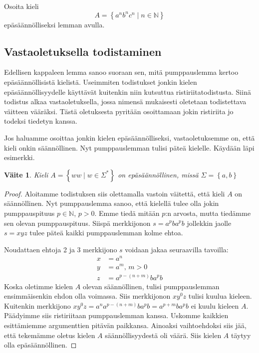\documentclass[a4paper,11pt]{article}
\newtheorem*{claim}{Väite}
\theoremstyle{definition}
\newcommand{\set}[1]{{\left\{ #1 \right\}}}
\newcommand{\Nat}{\mathbb{N}}
\begin{document}
\begin{exercise}
  Osoita kieli
  \begin{equation*}
      A = \set{a^nb^nc^n \mid n \in \Nat}
  \end{equation*}
  epäsäännölliseksi lemman avulla.
\end{exercise}

\subsection*{Vastaoletuksella todistaminen}

Edellisen kappaleen lemma sanoo suoraan sen, mitä pumppauslemma kertoo
e\-pä\-sään\-nöl\-li\-sis\-tä kielistä. Useimmiten todistukset jonkin
kielen e\-pä\-sään\-nöl\-li\-syy\-del\-le käyttävät kuitenkin niin
kutsuttua ristiriitatodistusta. Siinä todistus alkaa vastaoletuksella,
jossa nimensä mukaisesti oletetaan todistettava väitteen vääräksi.
Tästä oletuksesta pyritään osoittamaan jokin ristiriita jo todeksi
tiedetyn kanssa.

Jos haluamme osoittaa jonkin kielen epäsäännölliseksi, vastaoletuksemme on,
että kieli onkin säännöllinen. Nyt pumppauslemman tulisi päteä kielelle.
Käydään läpi esimerkki.

\begin{claim}
    Kieli $A = \set{ww \mid w \in \Sigma^*}$ on epäsäännöllinen, missä $\Sigma
    = \set{a,b}$
\end{claim}
\begin{proof}
    Aloitamme todistuksen siis olettamalla vastoin väi\-tet\-tä, että
    kieli $A$ on sään\-nöl\-li\-nen. Nyt pumppauslemma sanoo, että
    kielellä tulee olla jokin pumppauspituus $p \in \Nat$, $p > 0$.
    Emme tiedä mitään $p$:n arvosta, mutta tiedämme sen olevan
    pumppauspituus. Siispä merkkijonon $s = a^pba^pb$ jollekkin jaolle
    $s = xyz$ tulee päteä kaikki pumppauslemman kolme ehtoa.

    Noudattaen ehtoja 2 ja 3 merkkijono $s$ voidaan jakaa seuraavilla tavoilla:
    \begin{align*}
        x & = a^n \\
        y & = a^m \text{, } m > 0 \\
        z & = a^{p-(n+m)}ba^pb
    \end{align*}
    Koska oletimme kielen $A$ olevan säännöllinen, tulisi pumppauslemman
    ensimmäisenkin ehdon olla voimassa. Siis merkkijonon $xy^0z$ tulisi kuulua
    kieleen. Kuitenkin merkkijono $xy^0z = a^na^{p-(n+m)}ba^pb = a^{p+m}ba^pb$ ei
    kuulu kieleen $A$. Päädyimme siis ristiriitaan pumppauslemman kanssa.
    Uskomme kaikkien esittämiemme argumenttien pitävän paikkansa.  Ainoaksi
    vaihtoehdoksi siis jää, että tekemämme oletus kielen $A$
    sään\-nöl\-li\-syy\-des\-tä oli väärä. Siis kielen $A$ täytyy olla
    epäsäännöllinen.
\end{proof}
\end{document}
